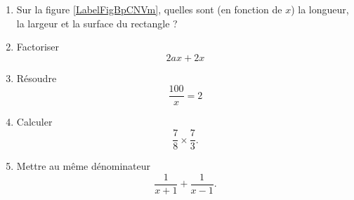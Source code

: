 
\begin{exercice}\label{exoSeconde-0018}


    \begin{enumerate}
        \item
Sur la figure \ref{LabelFigBpCNVm}, quelles sont (en fonction de \( x\)) la longueur, la largeur et la surface du rectangle ?
\newcommand{\CaptionFigBpCNVm}{figure de l'exercice \ref{exoSeconde-0018}} 

        \item
            Factoriser
            \begin{equation}
                2ax+2x   
            \end{equation}
        \item
            Résoudre
            \begin{equation}
                \frac{ 100 }{ x }=2
            \end{equation}
        \item
            Calculer
            \begin{equation}
                \frac{ 7 }{ 8 }\times\frac{ 7 }{ 3 }.
            \end{equation}
        \item
            Mettre au même dénominateur
            \begin{equation}
                \frac{1}{ x+1 }+\frac{1}{ x-1 }.
            \end{equation}
    \end{enumerate}

\end{exercice}
